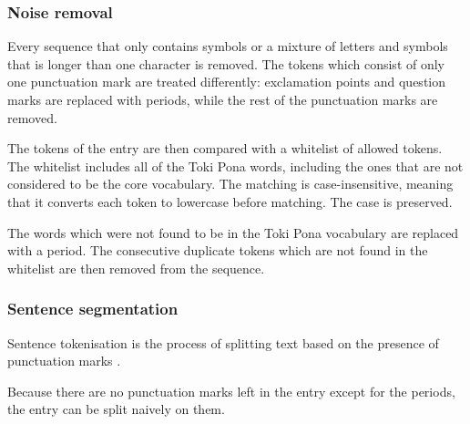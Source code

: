 \documentclass[14pt, a4paper]{extreport}
\begin{document}
%
      \subsubsection{Noise removal}
Every sequence that only contains symbols or a mixture of letters and symbols that is longer than one character is removed. The tokens which consist of only one punctuation mark are treated differently: exclamation points and question marks are replaced with periods, while the rest of the punctuation marks are removed.

The tokens of the entry are then compared with a whitelist of allowed tokens. The whitelist includes all of the Toki Pona words, including the ones that are not considered to be the core vocabulary. The matching is case-insensitive, meaning that it converts each token to lowercase before matching. The case is preserved.

The words which were not found to be in the Toki Pona vocabulary are replaced with a period. The consecutive duplicate tokens which are not found in the whitelist are then removed from the sequence.

%
      \subsubsection{Sentence segmentation}
Sentence tokenisation is the process of splitting text based on the presence of punctuation marks \parencite[51]{vajjala}.

Because there are no punctuation marks left in the entry except for the periods, the entry can be split naively on them.
\end{document}
